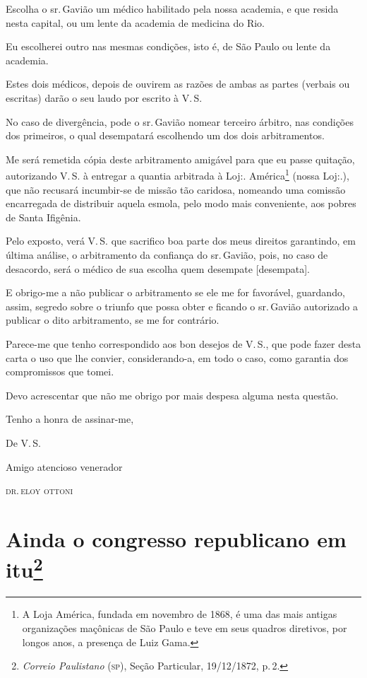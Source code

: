 Escolha o sr.\,Gavião um médico habilitado pela nossa academia, e que
resida nesta capital, ou um lente da academia de medicina do Rio.

Eu escolherei outro nas mesmas condições, isto é, de São Paulo ou lente
da academia.

Estes dois médicos, depois de ouvirem as razões de ambas as partes
(verbais ou escritas) darão o seu laudo por escrito à V.\,S.

No caso de divergência, pode o sr.\,Gavião nomear terceiro árbitro, nas
condições dos primeiros, o qual desempatará escolhendo um dos dois
arbitramentos.

Me será remetida cópia deste arbitramento amigável para que eu passe
quitação, autorizando V.\,S. à entregar a quantia arbitrada à Loj:.
América\footnote{ A Loja América, fundada em novembro de 1868, é uma
  das mais antigas organizações maçônicas de São Paulo e teve em seus
  quadros diretivos, por longos anos, a presença de Luiz Gama.} (nossa
Loj:.), que não recusará incumbir-se de missão tão caridosa, nomeando
uma comissão encarregada de distribuir aquela esmola, pelo modo mais
conveniente, aos pobres de Santa Ifigênia.

Pelo exposto, verá V.\,S. que sacrifico boa parte dos meus direitos
garantindo, em última análise, o arbitramento da confiança do sr.\,Gavião, pois, no caso de desacordo, será o médico de sua escolha quem
desempate {[}desempata{]}.

E obrigo-me a não publicar o arbitramento se ele me for favorável,
guardando, assim, segredo sobre o triunfo que possa obter e ficando o
sr.\,Gavião autorizado a publicar o dito arbitramento, se me for
contrário.

Parece-me que tenho correspondido aos bon desejos de V.\,S., que pode
fazer desta carta o uso que lhe convier, considerando-a, em todo o caso,
como garantia dos compromissos que tomei.

Devo acrescentar que não me obrigo por mais despesa alguma nesta
questão.

Tenho a honra de assinar-me,

\begin{flushright}
De V.\,S.

Amigo atencioso venerador

\textsc{dr.\,eloy ottoni}
\end{flushright}

\chapter{Ainda o congresso republicano em itu\footnote{\emph{Correio Paulistano} (\textsc{sp}), Seção Particular,
  19/12/1872, p.\,2.}} %

